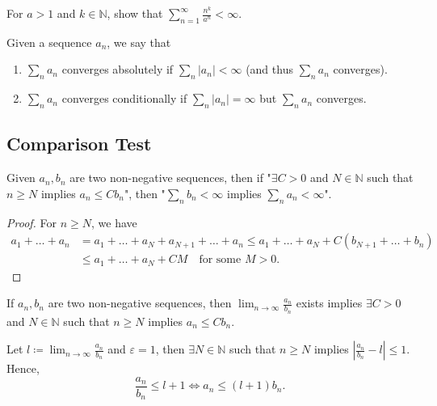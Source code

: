 \begin{exercise}
    For \(a > 1\) and \(k \in \mathbb{N} \), show that \(\sum_{n=1}^{\infty} \frac{n^k}{a^n} < \infty  \).   
\end{exercise}

\begin{definition}
    Given a sequence \(a_n\), we say that
    \begin{enumerate}
        \item \(\sum_{n} a_n \) converges absolutely if \(\sum_{n} \vert a_n \vert < \infty \) (and thus \(\sum_{n} a_n \) converges). 
        \item \(\sum_{n} a_n \) converges conditionally if \(\sum_{n} \vert a_n \vert = \infty \) but \(\sum_{n} a_n \) converges.     
    \end{enumerate} 
\end{definition}

\subsection{Comparison Test} \label{subsec: ct}
\begin{theorem} \label{thm: Comparison Test}
    Given \(a_n, b_n\) are two non-negative sequences, then if "\(\exists C > 0\) and \(N \in \mathbb{N} \) such that \(n \ge N\) implies \(a_n \le C b_n\)", then "\(\sum_{n} b_n < \infty \) implies \(\sum_{n} a_n < \infty \)".   
\end{theorem}
\begin{proof}
    For \(n \ge N\), we have 
    \begin{align*}
        a_1 + \dots + a_n &= a_1 +\dots + a_N + a_{N+1} + \dots + a_n  \le a_1 + \dots + a_N + C \left( b_{N+1} + \dots + b_n  \right) \\
        &\le a_1 + \dots + a_N + CM \quad \text{for some }M>0. 
    \end{align*}
\end{proof}

\begin{claim}
    If \(a_n,b_n\) are two non-negative sequences, then \(\lim_{n \to \infty} \frac{a_n}{b_n} \) exists implies \(\exists C > 0\) and \(N \in \mathbb{N} \) such that \(n \ge N\) implies \(a_n \le C b_n\).   
\end{claim}

\begin{explanation}
    Let \(l \coloneqq \lim_{n \to \infty} \frac{a_n}{b_n} \) and \(\varepsilon = 1\), then \(\exists N \in \mathbb{N} \) such that \(n \ge N\) implies \(\left\vert \frac{a_n}{b_n} - l \right\vert \le 1 \). Hence,
    \[
        \frac{a_n}{b_n} \le l + 1 \iff a_n \le (l + 1) b_n.
    \]    
\end{explanation}


